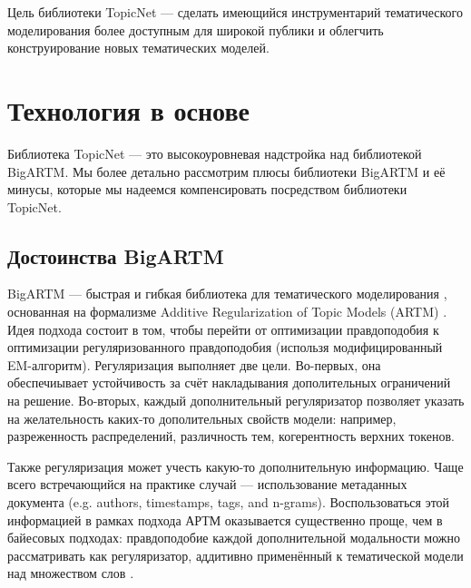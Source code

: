 Цель библиотеки TopicNet --- сделать имеющийся инструментарий тематического моделирования более доступным для широкой публики и облегчить конструирование новых тематических моделей.


\section{Технология в основе}

Библиотека TopicNet --- это высокоуровневая надстройка над библиотекой BigARTM. Мы более детально рассмотрим плюсы библиотеки \mbox{BigARTM} и её минусы, которые мы надеемся компенсировать посредством библиотеки TopicNet.

\subsection{Достоинства BigARTM}


BigARTM --- быстрая и гибкая библиотека для тематического моделирования \cite{frei2016parallel}, основанная на формализме Additive Regularization of Topic Models (ARTM) \cite{voron14dan-eng}. Идея подхода состоит в том, чтобы перейти от оптимизации правдоподобия к оптимизации регуляризованного правдоподобия (использя модифицированный EM-алгоритм). 
Регуляризация выполняет две цели. Во-первых, она обеспечиывает устойчивость за счёт накладывания дополительных ограничений на решение. Во-вторых, каждый дополнительный регуляризатор позволяет указать на желательность каких-то дополительных свойств модели: например, разреженность распределений, различность тем, когерентность верхних токенов. 

Также регуляризация может учесть какую-то дополнительную информацию. Чаще всего встречающийся на практике случай --- использование метаданных документа (e.g. authors, timestamps, tags, and n-grams). Воспользоваться этой информацией в рамках подхода АРТМ оказывается существенно проще, чем в байесовых подходах: правдоподобие каждой дополнительной модальности можно рассматривать как регуляризатор, аддитивно применённый к тематической модели над множеством слов \cite{voron15nonbayesian}.

